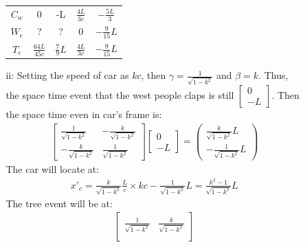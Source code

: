 \documentclass{article}
\begin{document}
\begin{itemize}
\begin{itemize}
\begin{itemize}
\begin{center}
\begin{tabular}{ c c c c c}
            \(C_w\) & 0&-L&\(\frac{4L}{3c}\)&\(-\frac{5L}{3}\) \\
            \(W_e\) &?&?&0&\(-\frac{9}{15}L\)\\
            \(T_c\) &\(\frac{64L}{45c}\)&\(\frac{7}{9}L\)&\(\frac{4L}{3c}\)&\(-\frac{9}{15}L\)
            \end{tabular}
            \end{center}
            \item [ii:] Setting the speed of car as \(kc\), then \(\gamma = \frac{1}{\sqrt{1-k^2}}\) and \(\beta = k\).
                        Thus, the space time event that the west people claps is still \(\begin{bmatrix}
                        0\\-L
                        \end{bmatrix}\). Then the space time even in car's frame is:
                        \begin{align*}
                            \begin{bmatrix}
                                \frac{1}{\sqrt{1-k^2}}&-\frac{k}{\sqrt{1-k^2}}\\
                                -\frac{k}{\sqrt{1-k^2}}&\frac{1}{\sqrt{1-k^2}}
                            \end{bmatrix}
                            \begin{bmatrix}
                                0\\-L
                            \end{bmatrix}=
                            \begin{pmatrix}
                                \frac{k}{\sqrt{1-k^2}}L\\ 
                                -\frac{1}{\sqrt{1-k^2}}L
                            \end{pmatrix}
                        \end{align*}
                        The car will locate at:
                        \begin{align*}
                            x'_c  =  \frac{k}{\sqrt{1-k^2}}\frac{L}{c}\times kc-\frac{1}{\sqrt{1-k^2}}L = \frac{k^2-1}{\sqrt{1-k^2}}L
                        \end{align*}
                        The tree event will be at:
                        \begin{align*}
                            \begin{bmatrix}
                                \frac{1}{\sqrt{1-k^2}}&\frac{k}{\sqrt{1-k^2}}\\

\end{bmatrix}
\end{align*}
\end{itemize}
\end{itemize}
\end{itemize}
\end{document}
